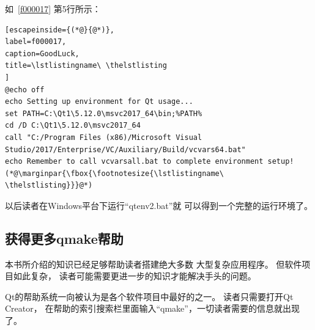 如\lstlistingname\ \ref{f000017}
第5行所示：
\FloatBarrier
\begin{lstlisting}[escapeinside={(*@}{@*)},
label=f000017,
caption=GoodLuck,
title=\lstlistingname\ \thelstlisting
]
@echo off
echo Setting up environment for Qt usage...
set PATH=C:\Qt1\5.12.0\msvc2017_64\bin;%PATH%
cd /D C:\Qt1\5.12.0\msvc2017_64
call "C:/Program Files (x86)/Microsoft Visual Studio/2017/Enterprise/VC/Auxiliary/Build/vcvars64.bat"
echo Remember to call vcvarsall.bat to complete environment setup!
(*@\marginpar{\fbox{\footnotesize{\lstlistingname\ \thelstlisting}}}@*)\end{lstlisting}          %

以后读者在Windows平台下运行“qtenv2.bat”就
可以得到一个完整的运行环境了。

\FloatBarrier
\subsection{
获得更多qmake帮助
}\label{ss000a10}


本书所介绍的知识已经足够帮助读者搭建绝大多数
大型复杂应用程序。
但软件项目如此复杂，
读者可能需要更进一步的知识才能解决手头的问题。

Qt的帮助系统一向被认为是各个软件项目中最好的之一。
读者只需要打开Qt Creator，
在帮助的索引搜索栏里面输入“qmake”，一切读者需要的信息就出现了。


